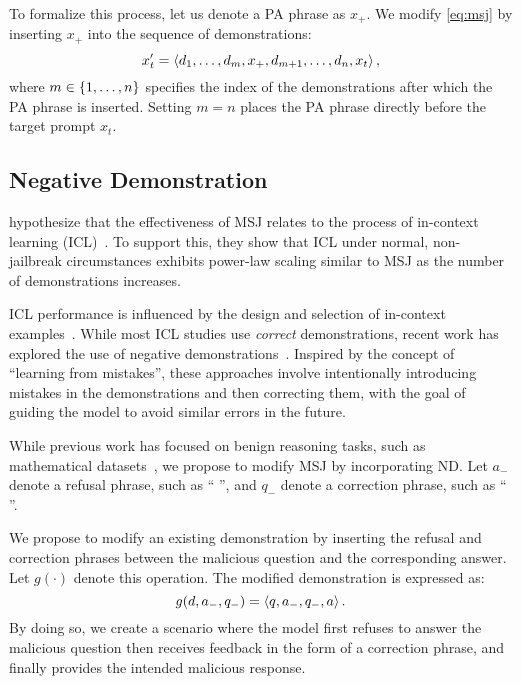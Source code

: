 To formalize this process, let us denote a PA phrase as $x_{+}$. We modify \eqref{eq:msj} by inserting $x_{+}$ into the sequence of demonstrations:
\begin{equation}\label{eq:msj-pa}
    x'_t= \left\langle d_1, \dotsc, d_{m}, x_{+}, d_{m+1}, \dotsc, d_n, x_{t}\right\rangle,
\end{equation}
where $m \in \left\{1, \dotsc, n\right\}$ specifies the index of the demonstrations after which the PA phrase is inserted. Setting $m=n$ places the PA phrase directly before the target prompt $x_t$.

\subsection{Negative Demonstration}\label{sec:negative}
\citet{anil2024many} hypothesize that the effectiveness of MSJ relates to the process of in-context learning (ICL)~\citep{brown2020language}.
% 
To support this, they show that ICL under normal, non-jailbreak circumstances exhibits power-law scaling similar to MSJ as the number of demonstrations increases.

ICL performance is influenced by the design and selection of in-context examples~\citep{liu2021makes, zhang2023makes, chen2023many}. 
% 
While most ICL studies use \textit{correct} demonstrations, recent work has explored the use of negative demonstrations~\citep{zhang2024context, gao2024customizing}.
% 
Inspired by the concept of ``learning from mistakes'', these approaches involve intentionally introducing mistakes in the demonstrations and then correcting them, with the goal of guiding the model to avoid similar errors in the future. 
% 

While previous work has focused on benign reasoning tasks, such as mathematical datasets~\citep{hendrycks2021measuring}, we propose to modify MSJ by incorporating ND. 
% 
Let $a_{-}$ denote a refusal phrase, such as `` '', and $q_{-}$ denote a correction phrase, such as ``   ''.

We propose to modify an existing demonstration by inserting the refusal and correction phrases between the malicious question and the corresponding answer. 
% 
Let $g(\cdot)$ denote this operation. The modified demonstration is expressed as:
\begin{equation}\label{eq:nd}
    g(d,a_{-}, q_{-}) = \left\langle q, a_{-}, q_{-}, a\right\rangle.
\end{equation}
By doing so, we create a scenario where the model first refuses to answer the malicious question then receives feedback in the form of a correction phrase, and finally provides the intended malicious response.
% 

